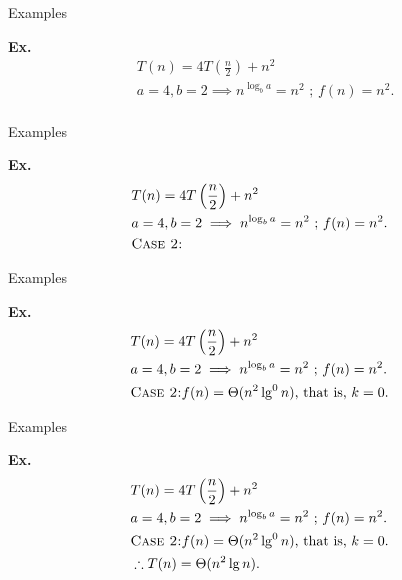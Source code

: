 \documentclass{beamer}
\begin{document}
\begin{frame}{Examples}
    \begin{exampleblock}{\textbf{Ex.}}
        \vspace{-8mm}
        \begin{align*}
            & T(n) = 4T\left(\frac{n}{2} \right) + n^2 \\
            & a = 4, b = 2 \implies n^{\log_b a} = n^2 \text{ ; } f(n) = n^2 \text{.} \\
        \end{align*}
    \end{exampleblock}
\end{frame}

\begin{frame}{Examples}
    \begin{exampleblock}{\textbf{Ex.}}
        \vspace{-8mm}
        \begin{align*}
            & T(n) = 4T\left(\frac{n}{2} \right) + n^2 \\
            & a = 4, b = 2 \implies n^{\log_b a} = n^2 \text{ ; } f(n) = n^2 \text{.} \\
            & \text{\textsc{Case 2:}} \\
        \end{align*}
    \end{exampleblock}
\end{frame}

\begin{frame}{Examples}
    \begin{exampleblock}{\textbf{Ex.}}
        \vspace{-8mm}
        \begin{align*}
            & T(n) = 4T\left(\frac{n}{2} \right) + n^2 \\
            & a = 4, b = 2 \implies n^{\log_b a} = n^2 \text{ ; } f(n) = n^2 \text{.} \\
            & \text{\textsc{Case 2:}} f(n) = \Theta(n^2\lg^0n) \text{, that is, } k = 0 \text{.} \\
        \end{align*}
    \end{exampleblock}
\end{frame}

\begin{frame}{Examples}
    \begin{exampleblock}{\textbf{Ex.}}
        \vspace{-8mm}
        \begin{align*}
            & T(n) = 4T\left(\frac{n}{2} \right) + n^2 \\
            & a = 4, b = 2 \implies n^{\log_b a} = n^2 \text{ ; } f(n) = n^2 \text{.} \\
            & \text{\textsc{Case 2:}} f(n) = \Theta(n^2\lg^0n) \text{, that is, } k = 0 \text{.} \\
            & \therefore T(n) = \Theta(n^2 \lg n) \text{.} \\
        \end{align*}
    \end{exampleblock}
\end{frame}
\end{document}
